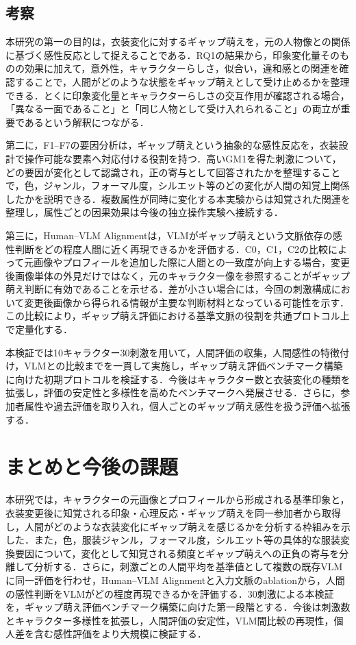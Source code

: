 \documentclass[a4j,twocolumn,11pt]{jarticle}
\begin{document}
\subsection{考察}
本研究の第一の目的は，衣装変化に対するギャップ萌えを，元の人物像との関係に基づく感性反応として捉えることである．RQ1の結果から，印象変化量そのものの効果に加えて，意外性，キャラクターらしさ，似合い，違和感との関連を確認することで，人間がどのような状態をギャップ萌えとして受け止めるかを整理できる．とくに印象変化量とキャラクターらしさの交互作用が確認される場合，「異なる一面であること」と「同じ人物として受け入れられること」の両立が重要であるという解釈につながる．

第二に，F1--F7の要因分析は，ギャップ萌えという抽象的な感性反応を，衣装設計で操作可能な要素へ対応付ける役割を持つ．高いGM1を得た刺激について，どの要因が変化として認識され，正の寄与として回答されたかを整理することで，色，ジャンル，フォーマル度，シルエット等のどの変化が人間の知覚上関係したかを説明できる．複数属性が同時に変化する本実験からは知覚された関連を整理し，属性ごとの因果効果は今後の独立操作実験へ接続する．

第三に，Human--VLM Alignmentは，VLMがギャップ萌えという文脈依存の感性判断をどの程度人間に近く再現できるかを評価する．C0，C1，C2の比較によって元画像やプロフィールを追加した際に人間との一致度が向上する場合，変更後画像単体の外見だけではなく，元のキャラクター像を参照することがギャップ萌え判断に有効であることを示せる．差が小さい場合には，今回の刺激構成において変更後画像から得られる情報が主要な判断材料となっている可能性を示す．この比較により，ギャップ萌え評価における基準文脈の役割を共通プロトコル上で定量化する．

本検証では10キャラクター30刺激を用いて，人間評価の収集，人間感性の特徴付け，VLMとの比較までを一貫して実施し，ギャップ萌え評価ベンチマーク構築に向けた初期プロトコルを検証する．今後はキャラクター数と衣装変化の種類を拡張し，評価の安定性と多様性を高めたベンチマークへ発展させる．さらに，参加者属性や過去評価を取り入れ，個人ごとのギャップ萌え感性を扱う評価へ拡張する．

\section{まとめと今後の課題}
本研究では，キャラクターの元画像とプロフィールから形成される基準印象と，衣装変更後に知覚される印象・心理反応・ギャップ萌えを同一参加者から取得し，人間がどのような衣装変化にギャップ萌えを感じるかを分析する枠組みを示した．また，色，服装ジャンル，フォーマル度，シルエット等の具体的な服装変換要因について，変化として知覚される頻度とギャップ萌えへの正負の寄与を分離して分析する．さらに，刺激ごとの人間平均を基準値として複数の既存VLMに同一評価を行わせ，Human--VLM Alignmentと入力文脈のablationから，人間の感性判断をVLMがどの程度再現できるかを評価する．30刺激による本検証を，ギャップ萌え評価ベンチマーク構築に向けた第一段階とする．今後は刺激数とキャラクター多様性を拡張し，人間評価の安定性，VLM間比較の再現性，個人差を含む感性評価をより大規模に検証する．
\end{document}
